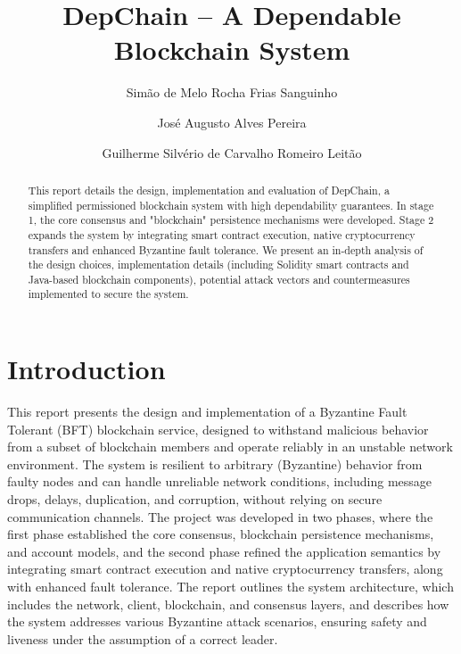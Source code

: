 \documentclass[runningheads]{llncs}
\begin{document}
\title{DepChain -- A Dependable Blockchain System}
\author{Simão de Melo Rocha Frias Sanguinho \and José Augusto Alves Pereira \and Guilherme Silvério de Carvalho Romeiro Leitão}
\maketitle

\begin{abstract}
    This report details the design, implementation and evaluation of DepChain, a simplified permissioned blockchain system with high dependability guarantees. In stage 1, the core consensus and "blockchain" persistence mechanisms were developed. Stage 2 expands the system by integrating smart contract execution, native cryptocurrency transfers and enhanced Byzantine fault tolerance. We present an in-depth analysis of the design choices, implementation details (including Solidity smart contracts and Java-based blockchain components), potential attack vectors and countermeasures implemented to secure the system.

\end{abstract}

\section{Introduction}
This report presents the design and implementation of a Byzantine Fault Tolerant (BFT) blockchain service, designed to withstand malicious behavior from a subset of blockchain members and operate reliably in an unstable network environment. The system is resilient to arbitrary (Byzantine) behavior from faulty nodes and can handle unreliable network conditions, including message drops, delays, duplication, and corruption, without relying on secure communication channels. The project was developed in two phases, where the first phase established the core consensus, blockchain persistence mechanisms, and account models, and the second phase refined the application semantics by integrating smart contract execution and native cryptocurrency transfers, along with enhanced fault tolerance. The report outlines the system architecture, which includes the network, client, blockchain, and consensus layers, and describes how the system addresses various Byzantine attack scenarios, ensuring safety and liveness under the assumption of a correct leader.
\end{document}
